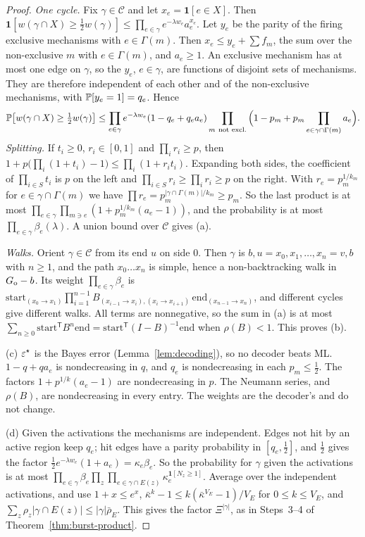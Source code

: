 \begin{proof}
\emph{One cycle.}
Fix $\gamma\in\mathcal C$ and let $x_e=\mathbf 1[e\in X]$. Then $\mathbf 1[w(\gamma\cap X)\ge\tfrac12w(\gamma)]\le\prod_{e\in\gamma}e^{-\lambda w_e}a_e^{x_e}$.
Let $y_e$ be the parity of the firing exclusive mechanisms with $e\in\Gamma(m)$. Then $x_e\le y_e+\sum f_m$, the sum over the non-exclusive $m$ with $e\in\Gamma(m)$, and $a_e\ge1$.
An exclusive mechanism has at most one edge on $\gamma$, so the $y_e$, $e\in\gamma$, are functions of disjoint sets of mechanisms. They are therefore independent of each other and of the non-exclusive mechanisms, with $\mathbb{P}[y_e=1]=q_e$. Hence
\[
\mathbb{P}\big[w(\gamma\cap X)\ge\tfrac12w(\gamma)\big]\le\prod_{e\in\gamma}e^{-\lambda w_e}(1-q_e+q_ea_e)\prod_{m\ \text{not excl.}}\Big(1-p_m+p_m\prod_{e\in\gamma\cap\Gamma(m)}a_e\Big).
\]
\emph{Splitting.} If $t_i\ge0$, $r_i\in[0,1]$ and $\prod_ir_i\ge p$, then $1+p\big(\prod_i(1+t_i)-1\big)\le\prod_i(1+r_it_i)$. Expanding both sides, the coefficient of $\prod_{i\in S}t_i$ is $p$ on the left and $\prod_{i\in S}r_i\ge\prod_ir_i\ge p$ on the right.
With $r_e=p_m^{1/k_m}$ for $e\in\gamma\cap\Gamma(m)$ we have $\prod r_e=p_m^{|\gamma\cap\Gamma(m)|/k_m}\ge p_m$. So the last product is at most $\prod_{e\in\gamma}\prod_{m\ni e}(1+p_m^{1/k_m}(a_e-1))$, and the probability is at most $\prod_{e\in\gamma}\beta_e(\lambda)$. A union bound over $\mathcal C$ gives (a).

\emph{Walks.}
Orient $\gamma\in\mathcal C$ from its end $u$ on side $0$. Then $\gamma$ is $b,u=x_0,x_1,\dots,x_n=v,b$ with $n\ge1$, and the path $x_0\dots x_n$ is simple, hence a non-backtracking walk in $G_{\rm o}-b$. Its weight $\prod_{e\in\gamma}\beta_e$ is $\mathrm{start}_{(x_0\to x_1)}\prod_{i=1}^{n-1}B_{(x_{i-1}\to x_i),(x_i\to x_{i+1})}\,\mathrm{end}_{(x_{n-1}\to x_n)}$, and different cycles give different walks. All terms are nonnegative, so the sum in (a) is at most $\sum_{n\ge0}\mathrm{start}^{\mathsf T}B^n\mathrm{end}=\mathrm{start}^{\mathsf T}(I-B)^{-1}\mathrm{end}$ when $\rho(B)<1$. This proves (b).

(c) $\varepsilon^{\star}$ is the Bayes error (Lemma~\ref{lem:decoding}), so no decoder beats ML. $1-q+qa_e$ is nondecreasing in $q$, and $q_e$ is nondecreasing in each $p_m\le\tfrac12$. The factors $1+p^{1/k}(a_e-1)$ are nondecreasing in $p$. The Neumann series, and $\rho(B)$, are nondecreasing in every entry. The weights are the decoder's and do not change.

(d) Given the activations the mechanisms are independent. Edges not hit by an active region keep $q_e$; hit edges have a parity probability in $[q_e,\tfrac12]$, and $\tfrac12$ gives the factor $\tfrac12e^{-\lambda w_e}(1+a_e)=\kappa_e\beta_e$. So the probability for $\gamma$ given the activations is at most $\prod_{e\in\gamma}\beta_e\prod_z\prod_{e\in\gamma\cap E(z)}\kappa_e^{\mathbf 1[N_z\ge1]}$.
Average over the independent activations, and use $1+x\le e^x$, $\bar\kappa^k-1\le k(\bar\kappa^{V_E}-1)/V_E$ for $0\le k\le V_E$, and $\sum_z\rho_z|\gamma\cap E(z)|\le|\gamma|\bar\rho_E$. This gives the factor $\Xi^{|\gamma|}$, as in Steps~3--4 of Theorem~\ref{thm:burst-product}.


\end{proof}
